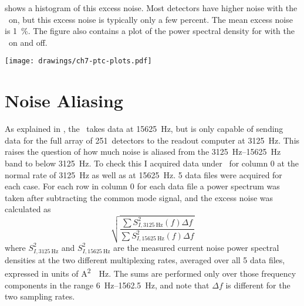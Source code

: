  shows a histogram of this excess noise. Most detectors have higher noise with the \PTC\ on, but this excess noise is typically only a few percent. 
The mean excess noise is \SI{1}{\percent}.
The figure also contains a plot of the power spectral density for  with the \PTC\ on and off.

\begin{figure*}
  \centering
\texttt{[image: drawings/ch7-ptc-plots.pdf]}
\caption[Plots showing impact of \PTC\ on noise]{
Plots showing impact of \PTC\ on noise.
\textbf{Left}
Histogram showing excess noise due to the \PTC, defined as ratio of total noise above \SI{6}{\Hz} (see text for precise definition).
More detectors have higher noise with the \PTC\ on than off, but the mean excess noise is only \SI{1}{\percent}.
\textbf{Right}
Current noise for  with \PTC\ on and off, after subtracting common mode noise.
The noise below \SI{30}{\Hz} is 1.5--2.5 times higher with the \PTC\ on, but the total noise at the relevant frequencies of $f >= \SI{6}{\Hz}$ is only \SI{2.9}{\percent}.
}
\label{fig:ch7-ptc-plots}
\end{figure*}

\section{Noise Aliasing} \label{sec:ch7-aliasing}

As explained in , the \MCE\ takes data at \SI{15625}{\hertz}, but is only capable of sending data for the full array of 251~detectors to the readout computer at \SI{3125}{\hertz}.
This raises the question of how much noise is aliased from the \SIrange{3125}{15625}{\hertz} band to below \SI{3125}{\hertz}.
To check this I acquired data under \SOC\ for column 0 at the normal rate of \SI{3125}{\hertz} as well as at \SI{15625}{\hertz}.
5 data files were acquired for each case. For each row in column 0 for each data file a power spectrum was taken after subtracting the common mode signal, and the excess noise was calculated as
\begin{equation}
  \sqrt{  \frac{ \sum S^2_{I,\SI{3125}{\Hz}}(f) \Delta f }
               { \sum S^2_{I,\SI{15625}{\Hz}}(f) \Delta f }}
\end{equation}
where $S^2_{I,\SI{3125}{\Hz}}$ and $S^2_{I,\SI{15625}{\Hz}}$ are the measured current noise power spectral densities at the two different multiplexing rates, averaged over all 5 data files, expressed in units of \si{\A^2 \per \Hz}.
The sums are performed only over those frequency components in the range \SIrange{6}{1562.5}{\Hz}, and note that $\Delta f$ is different for the two sampling rates.

